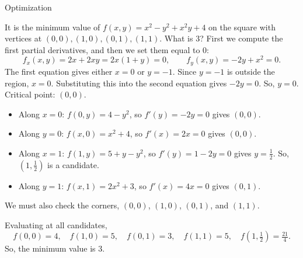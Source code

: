 \documentclass{article}
\begin{document}
\begin{category}{Optimization}
  \begin{clue}[say]
    It is the minimum value of $f(x,y) = x^2 - y^2+x^2y+4$ on the square with vertices at $(0,0),(1,0),(0,1),(1,1)$.
  \response
    What is $3$?
  \solution
    First we compute the first partial derivatives, and then we set them equal to 0:
    \[
    f_x(x,y)=2x+2xy=2x(1+y)=0,\qquad f_y(x,y)=-2y+x^2=0.
    \]
    The first equation gives either $x=0$ or $y=-1$. Since $y=-1$ is outside the region, $x=0$. Substituting this into the second equation gives $-2y=0$. So, $y=0$. Critical point: $(0,0)$.

    \begin{itemize}
    \item Along $x=0$: $f(0,y)=4-y^2$, so $f'(y)=-2y=0$ gives $(0,0)$.
    \item Along $y=0$: $f(x,0)=x^2+4$, so $f'(x)=2x=0$ gives $(0,0)$.
    \item Along $x=1$: $f(1,y)=5+y-y^2$, so $f'(y)=1-2y=0$ gives $y=\frac{1}{2}$. So, $(1,\tfrac{1}{2})$ is a candidate.
    \item Along $y=1$: $f(x,1)=2x^2+3$, so $f'(x)=4x=0$ gives $(0,1)$.
    \end{itemize}

    We must also check the corners, $(0,0)$, $(1,0)$, $(0,1)$, and $(1,1)$.

    Evaluating at all candidates,
    \[
    f(0,0)=4,\quad f(1,0)=5,\quad f(0,1)=3,\quad f(1,1)=5,\quad f\left(1,\tfrac{1}{2}\right)=\tfrac{21}{4}.
    \]
    So, the minimum value is $3$.
  \end{clue}

\end{category}
\end{document}
